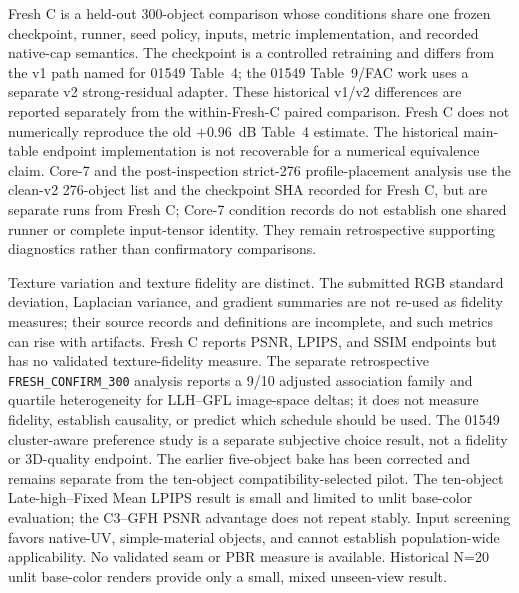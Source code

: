 \documentclass[times,twocolumn,final]{elsarticle}
\begin{document}
Fresh C is a held-out 300-object comparison whose conditions share one frozen checkpoint, runner, seed policy, inputs, metric implementation, and recorded native-cap semantics. The checkpoint is a controlled retraining and differs from the v1 path named for 01549 Table~4; the 01549 Table~9/FAC work uses a separate v2 strong-residual adapter. These historical v1/v2 differences are reported separately from the within-Fresh-C paired comparison. Fresh C does not numerically reproduce the old $+0.96$~dB Table~4 estimate. The historical main-table endpoint implementation is not recoverable for a numerical equivalence claim. Core-7 and the post-inspection strict-276 profile-placement analysis use the clean-v2 276-object list and the checkpoint SHA recorded for Fresh C, but are separate runs from Fresh C; Core-7 condition records do not establish one shared runner or complete input-tensor identity. They remain retrospective supporting diagnostics rather than confirmatory comparisons.

Texture variation and texture fidelity are distinct. The submitted RGB standard deviation, Laplacian variance, and gradient summaries are not re-used as fidelity measures; their source records and definitions are incomplete, and such metrics can rise with artifacts. Fresh C reports PSNR, LPIPS, and SSIM endpoints but has no validated texture-fidelity measure. The separate retrospective \texttt{FRESH\_CONFIRM\_300} analysis reports a 9/10 adjusted association family and quartile heterogeneity for LLH--GFL image-space deltas; it does not measure fidelity, establish causality, or predict which schedule should be used. The 01549 cluster-aware preference study is a separate subjective choice result, not a fidelity or 3D-quality endpoint. The earlier five-object bake has been corrected and remains separate from the ten-object compatibility-selected pilot. The ten-object Late-high--Fixed Mean LPIPS result is small and limited to unlit base-color evaluation; the C3--GFH PSNR advantage does not repeat stably. Input screening favors native-UV, simple-material objects, and cannot establish population-wide applicability. No validated seam or PBR measure is available. Historical N=20 unlit base-color renders provide only a small, mixed unseen-view result.
\end{document}
